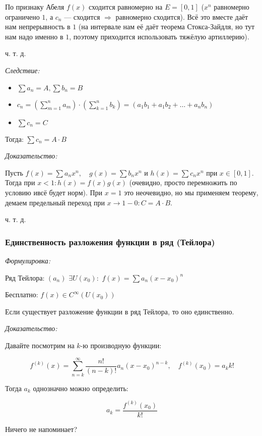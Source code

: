 \documentclass{article}
\def\dbl{\,\,}
\begin{document}
По признаку Абеля $f(x)$ сходится равномерно на $E = [0, 1]$ ($x^n$ равномерно ограничено $1$, а $c_n$ --- сходится $\Rightarrow$ равномерно сходится). Всё это вместе даёт нам непрерывность в $1$ (на интервале нам её даёт теорема Стокса-Зайдля, но тут нам надо именно в $1$, поэтому приходится использовать тяжёлую артиллерию).

ч. т. д.

\textit{Следствие:}

\begin{itemize}
    \item $\sum a_n = A, \sum b_n = B$
    \item $c_n = \left(\sum_{m = 1}^{n} a_m \right) \cdot \left(\sum_{k = 1}^{n} b_k \right) = (a_1b_1 + a_1b_2 + \ldots + a_nb_n)$
    \item $\sum c_n = C$
\end{itemize}

Тогда: $\sum c_n = A \cdot B$

\textit{Доказательство:}

Пусть $f(x) = \sum a_nx^n, \quad g(x) = \sum b_nx^n$ и $h(x) = \sum c_nx^n$ при $x \in [0, 1]$. Тогда при $x < 1: h(x) = f(x)g(x)$ (очевидно, просто перемножить по  условию ивсё будет норм). При $x = 1$ это неочевидно, но мы применяем теорему, демаем предельный переход при $x \rightarrow 1 - 0: C = A \cdot B$.

ч. т. д.

\subsubsection{Единственность разложения функции в ряд (Тейлора)}
\textit{Формулировка:}

Ряд Тейлора: $(a_n) \dbl \exists U(x_0): \dbl f(x) = \sum a_n (x - x_0)^n$

Бесплатно: $f(x) \in C^{\infty}(U(x_0))$

Если существует разложение функции в ряд Тейлора, то оно единственно.

\textit{Доказательство:}

Давайте посмотрим на $k$-ю производную функции:

\[f^{(k)}(x) = \sum_{n = k}^{\infty}\frac{n!}{(n - k)!}a_n(x - x_0)^{n - k}, \quad f^{(k)}(x_0) = a_kk!\]

Тогда $a_k$ однозначно можно определить: 

\[a_k = \frac{f^{(k)}(x_0)}{k!}\]

Ничего не напоминает?
\end{document}
